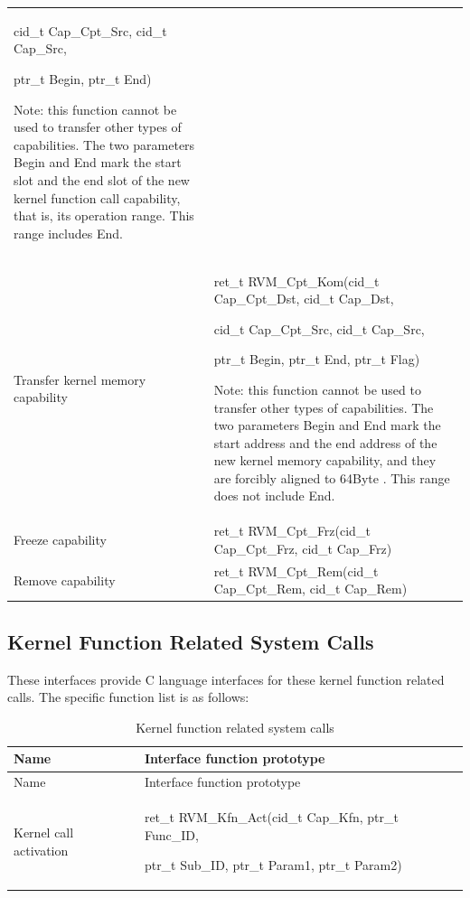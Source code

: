 \begin{xltabular}{\textwidth}{@{}>{\hsize\raggedright\arraybackslash}X>{\hsize\raggedright\arraybackslash}X@{}}
cid\_\allowbreak{}t Cap\_\allowbreak{}Cpt\_\allowbreak{}Src, cid\_\allowbreak{}t Cap\_\allowbreak{}Src,

ptr\_\allowbreak{}t Begin, ptr\_\allowbreak{}t End)

Note: this function cannot be used to transfer other types of capabilities. The two parameters Begin and End mark the start slot and the end slot of the new kernel function call capability, that is, its operation range. This range includes End.\strut
\tabularnewline
Transfer kernel memory capability\strut
 & ret\_\allowbreak{}t RVM\_\allowbreak{}Cpt\_\allowbreak{}Kom(cid\_\allowbreak{}t Cap\_\allowbreak{}Cpt\_\allowbreak{}Dst, cid\_\allowbreak{}t Cap\_\allowbreak{}Dst,

cid\_\allowbreak{}t Cap\_\allowbreak{}Cpt\_\allowbreak{}Src, cid\_\allowbreak{}t Cap\_\allowbreak{}Src,

ptr\_\allowbreak{}t Begin, ptr\_\allowbreak{}t End, ptr\_\allowbreak{}t Flag)

Note: this function cannot be used to transfer other types of capabilities. The two parameters Begin and End mark the start address and the end address of the new kernel memory capability, and they are forcibly aligned to 64Byte
. This range does not include End.\strut
\tabularnewline
Freeze capability & ret\_\allowbreak{}t RVM\_\allowbreak{}Cpt\_\allowbreak{}Frz(cid\_\allowbreak{}t Cap\_\allowbreak{}Cpt\_\allowbreak{}Frz, cid\_\allowbreak{}t
Cap\_\allowbreak{}Frz)\tabularnewline
Remove capability & ret\_\allowbreak{}t RVM\_\allowbreak{}Cpt\_\allowbreak{}Rem(cid\_\allowbreak{}t Cap\_\allowbreak{}Cpt\_\allowbreak{}Rem, cid\_\allowbreak{}t
Cap\_\allowbreak{}Rem)\tabularnewline
\end{xltabular}

\subsection{Kernel Function Related System Calls}\label{subsec:3-5-2}

These interfaces provide C language interfaces for these kernel function related calls. The specific function list is as follows:

\begin{xltabular}{\textwidth}{@{}>{\hsize\raggedright\arraybackslash}X>{\hsize\raggedright\arraybackslash}X@{}}
\caption{Kernel function related system calls}\label{tab:3-6}\\
\toprule
Name & Interface function prototype\tabularnewline
\endfirsthead
\toprule
Name & Interface function prototype\tabularnewline
\midrule
\endhead
\bottomrule
\endlastfoot
Kernel call activation\strut
 & ret\_\allowbreak{}t RVM\_\allowbreak{}Kfn\_\allowbreak{}Act(cid\_\allowbreak{}t Cap\_\allowbreak{}Kfn, ptr\_\allowbreak{}t Func\_\allowbreak{}ID,

ptr\_\allowbreak{}t Sub\_\allowbreak{}ID, ptr\_\allowbreak{}t Param1, ptr\_\allowbreak{}t Param2)\strut
\tabularnewline
\end{xltabular}

